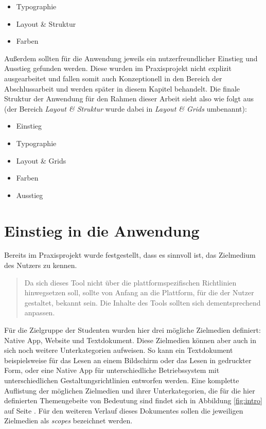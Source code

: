 \begin{itemize}
  \item Typographie
  \item Layout \& Struktur
  \item Farben
\end{itemize}

Außerdem sollten für die Anwendung jeweils ein nutzerfreundlicher Einstieg und Ausstieg gefunden werden. Diese wurden im Praxisprojekt nicht explizit ausgearbeitet und fallen somit auch Konzeptionell in den Bereich der Abschlussarbeit und werden später in diesem Kapitel behandelt.
Die finale Struktur der Anwendung für den Rahmen dieser Arbeit sieht also wie folgt aus (der Bereich \textit{Layout \& Struktur} wurde dabei in \textit{Layout \& Grids} umbenannt):

\begin{itemize}
  \item Einstieg
  \item Typographie
  \item Layout \& Grids
  \item Farben
  \item Ausstieg
\end{itemize}

\section{Einstieg in die Anwendung}
Bereits im Praxisprojekt wurde festgestellt, dass es sinnvoll ist, das Zielmedium des Nutzers zu kennen.

\begin{quote}
  Da sich dieses Tool nicht über die plattformspezifischen Richtlinien hinwegsetzen soll, sollte
von Anfang an die Plattform, für die der Nutzer gestaltet, bekannt sein. Die Inhalte des Tools
sollten sich dementsprechend anpassen. \cite{PoplawskiPP}
\end{quote}

Für die Zielgruppe der Studenten wurden hier drei mögliche Zielmedien definiert: Native App, Website und Textdokument. Diese Zielmedien können aber auch in sich noch weitere Unterkategorien aufweisen. So kann ein Textdokument beispielsweise für das Lesen an einem Bildschirm oder das Lesen in gedruckter Form, oder eine Native App für unterschiedliche Betriebssystem mit unterschiedlichen Gestaltungsrichtlinien entworfen werden. Eine komplette Auflistung der möglichen Zielmedien und ihrer Unterkategorien, die für die hier definierten Themengebeite von Bedeutung sind findet sich in Abbildung \ref{fig:intro} auf Seite \pageref{fig:intro}.
Für den weiteren Verlauf dieses Dokumentes sollen die jeweiligen Zielmedien als \textit{scopes} bezeichnet werden.

